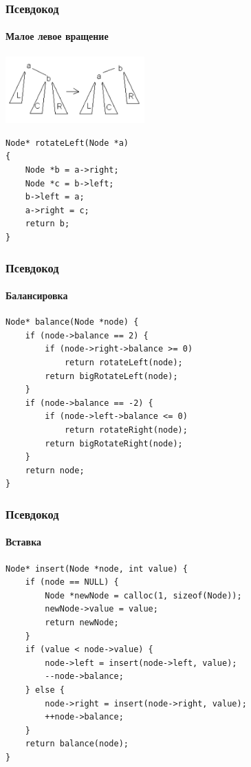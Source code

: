\documentclass{../../slides-style}
\begin{document}
    \begin{frame}[fragile]
        \frametitle{Псевдокод}
        \framesubtitle{Малое левое вращение}
        \begin{center}
            \includegraphics[width=0.4\textwidth]{small-left-rotation.png}
        \end{center}
        \begin{verbatim}
Node* rotateLeft(Node *a)
{
    Node *b = a->right;
    Node *c = b->left;
    b->left = a;
    a->right = c;
    return b;
}
        \end{verbatim}
    \end{frame}

    \begin{frame}[fragile]
        \frametitle{Псевдокод}
        \framesubtitle{Балансировка}
        \begin{verbatim}
Node* balance(Node *node) {
    if (node->balance == 2) {
        if (node->right->balance >= 0)
            return rotateLeft(node);
        return bigRotateLeft(node);
    }
    if (node->balance == -2) {
        if (node->left->balance <= 0)
            return rotateRight(node);
        return bigRotateRight(node);
    }
    return node;
}
        \end{verbatim}
    \end{frame}

    \begin{frame}[fragile]
        \frametitle{Псевдокод}
        \framesubtitle{Вставка}
        \begin{verbatim}
Node* insert(Node *node, int value) {
    if (node == NULL) {
        Node *newNode = calloc(1, sizeof(Node));
        newNode->value = value;
        return newNode;
    }
    if (value < node->value) {
        node->left = insert(node->left, value);
        --node->balance;
    } else {
        node->right = insert(node->right, value);
        ++node->balance;
    }
    return balance(node);
}
        \end{verbatim}
    \end{frame}
\end{document}
